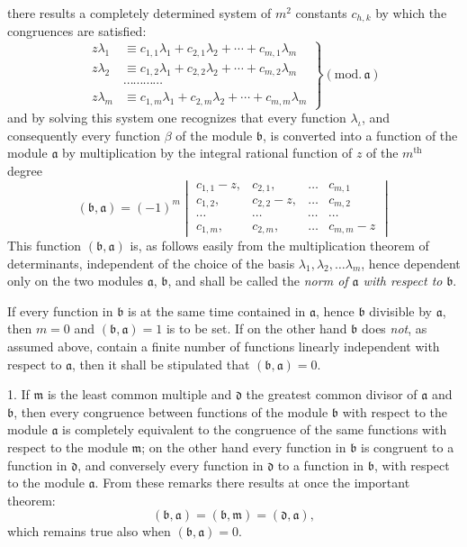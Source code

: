 \documentclass{article}
\begin{document}
there results a completely determined system of $m^{2}$ constants $c_{h,k}$ by which the congruences are satisfied:
\[ \left. \begin{aligned} z\lambda_{1} &\equiv c_{1,1}\lambda_{1} + c_{2,1}\lambda_{2} + \cdots + c_{m,1}\lambda_{m} \\ z\lambda_{2} &\equiv c_{1,2}\lambda_{1} + c_{2,2}\lambda_{2} + \cdots + c_{m,2}\lambda_{m} \\ &\cdots\cdots\cdots\cdots \\ z\lambda_{m} &\equiv c_{1,m}\lambda_{1} + c_{2,m}\lambda_{2} + \cdots + c_{m,m}\lambda_{m} \end{aligned} \right\} (\text{mod.}\,\mathfrak{a}) \]
and by solving this system one recognizes that every function $\lambda_{\iota}$, and consequently every function $\beta$ of the module $\mathfrak{b}$, is converted into a function of the module $\mathfrak{a}$ by multiplication by the integral rational function of $z$ of the $m^{\text{th}}$ degree
\[ (\mathfrak{b}, \mathfrak{a}) = (-1)^{m} \begin{vmatrix} c_{1,1}-z, & c_{2,1}, & \ldots & c_{m,1} \\ c_{1,2}, & c_{2,2}-z, & \ldots & c_{m,2} \\ \cdots & \cdots & \cdots & \cdots \\ c_{1,m}, & c_{2,m}, & \ldots & c_{m,m}-z \end{vmatrix} \]
This function $(\mathfrak{b}, \mathfrak{a})$ is, as follows easily from the multiplication theorem of determinants, independent of the choice of the basis $\lambda_{1}, \lambda_{2}, \ldots \lambda_{m}$, hence dependent only on the two modules $\mathfrak{a}$, $\mathfrak{b}$, and shall be called the \emph{norm of $\mathfrak{a}$ with respect to} $\mathfrak{b}$.

If every function in $\mathfrak{b}$ is at the same time contained in $\mathfrak{a}$, hence $\mathfrak{b}$ divisible by $\mathfrak{a}$, then $m = 0$ and $(\mathfrak{b}, \mathfrak{a}) = 1$ is to be set. If on the other hand $\mathfrak{b}$ does \emph{not}, as assumed above, contain a finite number of functions linearly independent with respect to $\mathfrak{a}$, then it shall be stipulated that $(\mathfrak{b}, \mathfrak{a}) = 0$.

1. If $\mathfrak{m}$ is the least common multiple and $\mathfrak{d}$ the greatest common divisor of $\mathfrak{a}$ and $\mathfrak{b}$, then every congruence between functions of the module $\mathfrak{b}$ with respect to the module $\mathfrak{a}$ is completely equivalent to the congruence of the same functions with respect to the module $\mathfrak{m}$; on the other hand every function in $\mathfrak{b}$ is congruent to a function in $\mathfrak{d}$, and conversely every function in $\mathfrak{d}$ to a function in $\mathfrak{b}$, with respect to the module $\mathfrak{a}$. From these remarks there results at once the important theorem:
\[ (\mathfrak{b}, \mathfrak{a}) = (\mathfrak{b}, \mathfrak{m}) = (\mathfrak{d}, \mathfrak{a}), \]
which remains true also when $(\mathfrak{b}, \mathfrak{a}) = 0$.
\end{document}
